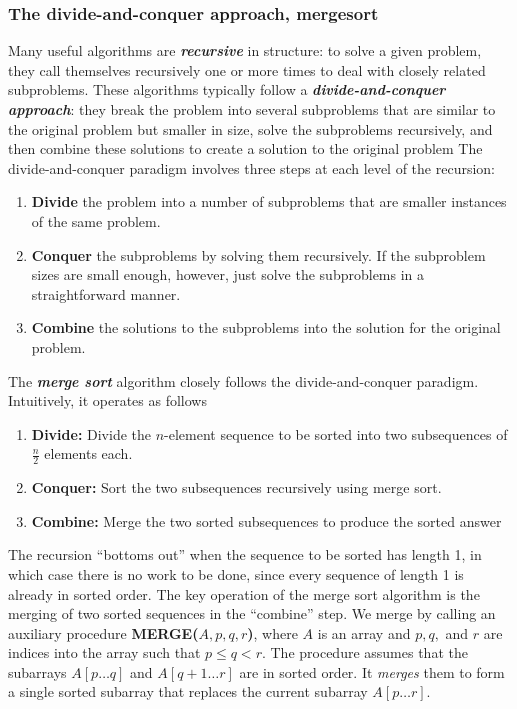 \documentclass{report}
\begin{document}
    \subsubsection{The divide-and-conquer approach, mergesort}
    \bigbreak \noindent 
    Many useful algorithms are \textbf{\textit{recursive}} in structure: to solve a given problem, they call themselves recursively one or more times to deal with closely related subproblems. These algorithms typically follow a \textbf{\textit{divide-and-conquer approach}}: they break the problem into several subproblems that are similar to the original problem but smaller in size, solve the subproblems recursively, and then combine these solutions to create a solution to the original problem
    \bigbreak \noindent 
    The divide-and-conquer paradigm involves three steps at each level of the recursion:
    \begin{enumerate}
        \item \textbf{Divide} the problem into a number of subproblems that are smaller instances of the same problem.
        \item \textbf{Conquer} the subproblems by solving them recursively. If the subproblem sizes are small enough, however, just solve the subproblems in a straightforward manner.
        \item \textbf{Combine} the solutions to the subproblems into the solution for the original problem.
    \end{enumerate}
    \bigbreak \noindent 
    The \textbf{\textit{merge sort}} algorithm closely follows the divide-and-conquer paradigm. Intuitively, it operates as follows
    \begin{enumerate}
        \item \textbf{Divide:} Divide the $n$-element sequence to be sorted into two subsequences of $\frac{n}{2}$ elements each.
        \item \textbf{Conquer:} Sort the two subsequences recursively using merge sort.
        \item \textbf{Combine:} Merge the two sorted subsequences to produce the sorted answer 
    \end{enumerate}
    \bigbreak \noindent 
    The recursion “bottoms out” when the sequence to be sorted has length 1, in which case there is no work to be done, since every sequence of length 1 is already in sorted order.
    \bigbreak \noindent 
    The key operation of the merge sort algorithm is the merging of two sorted sequences in the ``combine'' step. We merge by calling an auxiliary procedure \textbf{MERGE(\(A, p, q, r\))}, where \( A \) is an array and \( p, q, \) and \( r \) are indices into the array such that \( p \leq q < r \). The procedure assumes that the subarrays \( A[p \ldots q] \) and \( A[q + 1 \ldots r] \) are in sorted order. It \textit{merges} them to form a single sorted subarray that replaces the current subarray \( A[p \ldots r] \).
\end{document}

